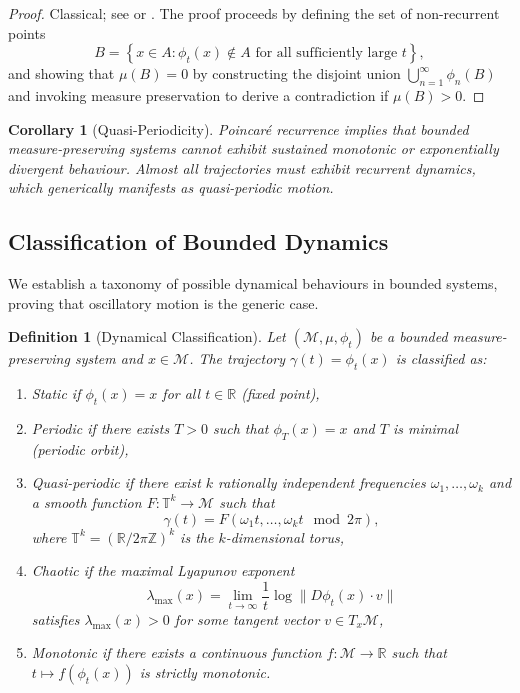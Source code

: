 \documentclass[twocolumn,10pt,a4paper]{article}
\newtheorem{corollary}[theorem]{Corollary}
\newtheorem{definition}[theorem]{Definition}
\theoremstyle{remark}
\newcommand{\manifold}{\mathcal{M}}
\newcommand{\Reals}{\mathbb{R}}
\newcommand{\Integers}{\mathbb{Z}}
\begin{document}
\begin{proof}
Classical; see \citet{Poincare1890} or \citet{Halmos1956}. The proof proceeds by defining the set of non-recurrent points
\begin{equation}
B = \left\{x \in A : \phi_t(x) \notin A \text{ for all sufficiently large } t\right\},
\end{equation}
and showing that $\mu(B) = 0$ by constructing the disjoint union $\bigcup_{n=1}^\infty \phi_n(B)$ and invoking measure preservation to derive a contradiction if $\mu(B) > 0$.
\end{proof}

\begin{corollary}[Quasi-Periodicity]
\label{cor:quasi_periodic}
Poincaré recurrence implies that bounded measure-preserving systems cannot exhibit sustained monotonic or exponentially divergent behaviour. Almost all trajectories must exhibit recurrent dynamics, which generically manifests as quasi-periodic motion.
\end{corollary}

\subsection{Classification of Bounded Dynamics}

We establish a taxonomy of possible dynamical behaviours in bounded systems, proving that oscillatory motion is the generic case.

\begin{definition}[Dynamical Classification]
\label{def:dynamics_classification}
Let $(\manifold, \mu, \phi_t)$ be a bounded measure-preserving system and $x \in \manifold$. The trajectory $\gamma(t) = \phi_t(x)$ is classified as:
\begin{enumerate}[label=(\roman*), noitemsep]
    \item \emph{Static} if $\phi_t(x) = x$ for all $t \in \Reals$ (fixed point),
    \item \emph{Periodic} if there exists $T > 0$ such that $\phi_T(x) = x$ and $T$ is minimal (periodic orbit),
    \item \emph{Quasi-periodic} if there exist $k$ rationally independent frequencies $\omega_1, \ldots, \omega_k$ and a smooth function $F: \mathbb{T}^k \to \manifold$ such that
    \begin{equation}
    \gamma(t) = F(\omega_1 t, \ldots, \omega_k t \mod 2\pi),
    \end{equation}
    where $\mathbb{T}^k = (\Reals / 2\pi\Integers)^k$ is the $k$-dimensional torus,
    \item \emph{Chaotic} if the maximal Lyapunov exponent
    \begin{equation}
    \lambda_{\max}(x) = \lim_{t \to \infty} \frac{1}{t} \log \|D\phi_t(x) \cdot v\|
    \end{equation}
    satisfies $\lambda_{\max}(x) > 0$ for some tangent vector $v \in T_x\manifold$,
    \item \emph{Monotonic} if there exists a continuous function $f: \manifold \to \Reals$ such that $t \mapsto f(\phi_t(x))$ is strictly monotonic.
\end{enumerate}
\end{definition}
\end{document}
